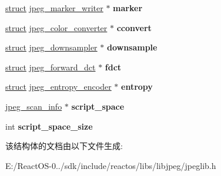 \begin{DoxyCompactItemize}
\item 
\mbox{\label{structjpeg__compress__struct_a909e4ca5c3c48f380a53cc1b068eea12}} 
\hyperlink{interfacestruct}{struct} \hyperlink{structjpeg__marker__writer}{jpeg\+\_\+marker\+\_\+writer} $\ast$ {\bfseries marker}
\item 
\mbox{\label{structjpeg__compress__struct_a7c51e665f18d6e5a0fed053c470f4914}} 
\hyperlink{interfacestruct}{struct} \hyperlink{structjpeg__color__converter}{jpeg\+\_\+color\+\_\+converter} $\ast$ {\bfseries cconvert}
\item 
\mbox{\label{structjpeg__compress__struct_a65a72b804640a0c339863f6562098113}} 
\hyperlink{interfacestruct}{struct} \hyperlink{structjpeg__downsampler}{jpeg\+\_\+downsampler} $\ast$ {\bfseries downsample}
\item 
\mbox{\label{structjpeg__compress__struct_ac113c777486860f0b2f3784345073a83}} 
\hyperlink{interfacestruct}{struct} \hyperlink{structjpeg__forward__dct}{jpeg\+\_\+forward\+\_\+dct} $\ast$ {\bfseries fdct}
\item 
\mbox{\label{structjpeg__compress__struct_a30477f9e5f6be16823e1aff2762ae270}} 
\hyperlink{interfacestruct}{struct} \hyperlink{structjpeg__entropy__encoder}{jpeg\+\_\+entropy\+\_\+encoder} $\ast$ {\bfseries entropy}
\item 
\mbox{\label{structjpeg__compress__struct_ab4a2c220ed2cda1b0d4c88518d02a229}} 
\hyperlink{structjpeg__scan__info}{jpeg\+\_\+scan\+\_\+info} $\ast$ {\bfseries script\+\_\+space}
\item 
\mbox{\label{structjpeg__compress__struct_ae50a683b4baddef6571900ca6240b1a3}} 
int {\bfseries script\+\_\+space\+\_\+size}
\end{DoxyCompactItemize}


该结构体的文档由以下文件生成\+:\begin{DoxyCompactItemize}
\item 
E\+:/\+React\+O\+S-\/0../sdk/include/reactos/libs/libjpeg/jpeglib.\+h\end{DoxyCompactItemize}
